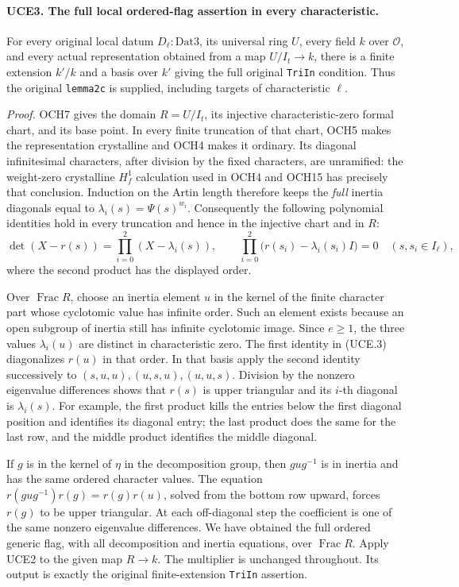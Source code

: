 \paragraph{UCE3. The full local ordered-flag assertion in every characteristic.}
\label{claim:UCE3}
For every original local datum \(D_\ell:\mathrm{Dat3}\), its
universal ring \(U\), every field \(k\) over \(\mathcal O\),
and every actual representation obtained from a map
\(U/I_t\to k\), there is a finite extension \(k'/k\) and a
basis over \(k'\) giving the full original \texttt{TriIn} condition.
Thus the original \texttt{lemma2c} is supplied, including targets
of characteristic \(\ell\).

\emph{Proof.}
OCH7 gives the domain \(R=U/I_t\), its injective characteristic-zero
formal chart, and its base point.  In every finite truncation of that
chart, OCH5 makes the representation crystalline and OCH4 makes it
ordinary.  Its diagonal infinitesimal characters, after division by
the fixed characters, are unramified: the weight-zero crystalline
\(H^1_f\) calculation used in OCH4 and OCH15 has precisely that
conclusion.  Induction on the Artin length therefore keeps the
\emph{full} inertia diagonals equal to
\(\lambda_i(s)=\Psi(s)^{w_i}\).
Consequently the following polynomial identities hold in every
truncation and hence in the injective chart and in \(R\):
\[
 \det(X-r(s))=\prod_{i=0}^2(X-\lambda_i(s)),\qquad
 \prod_{i=0}^2\bigl(r(s_i)-\lambda_i(s_i)I\bigr)=0
       \quad(s,s_i\in I_\ell),
 \tag{UCE.3}
\]
where the second product has the displayed order.

Over \(\operatorname{Frac}R\), choose an inertia element \(u\)
in the kernel of the finite character part whose cyclotomic value
has infinite order.  Such an element exists because an open subgroup
of inertia still has infinite cyclotomic image.  Since \(e\ge1\),
the three values \(\lambda_i(u)\) are distinct in characteristic
zero.  The first identity in (UCE.3) diagonalizes \(r(u)\) in that
order.  In that basis apply the second identity successively to
\((s,u,u),(u,s,u),(u,u,s)\).  Division by the nonzero eigenvalue
differences shows that \(r(s)\) is upper triangular and its
\(i\)-th diagonal is \(\lambda_i(s)\).  For example, the first
product kills the entries below the first diagonal position and
identifies its diagonal entry; the last product does the same for
the last row, and the middle product identifies the middle diagonal.

If \(g\) is in the kernel of \(\eta\) in the decomposition
group, then \(gug^{-1}\) is in inertia and has the same ordered
character values.  The equation
\(r(gug^{-1})r(g)=r(g)r(u)\), solved from the bottom row upward,
forces \(r(g)\) to be upper triangular.  At each off-diagonal
step the coefficient is one of the same nonzero eigenvalue
differences.  We have obtained the full ordered generic flag,
with all decomposition and inertia equations, over
\(\operatorname{Frac}R\).  Apply UCE2 to the given map \(R\to k\).
The multiplier is unchanged throughout.  Its output is exactly the
original finite-extension \texttt{TriIn} assertion.

